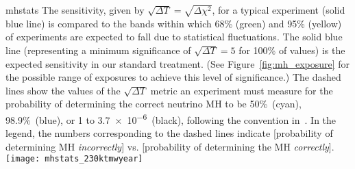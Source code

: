 \begin{cdrfigure}{mhstats}{
  The  sensitivity, given by  $\sqrt{\Delta T}=\sqrt{\Delta\chi^2}$, for a typical experiment 
  (solid blue line) is compared to the bands within which
  68\% (green) and 95\% (yellow) of experiments are expected to fall due to statistical fluctuations.
  The solid blue line (representing a minimum significance of $\sqrt{\Delta T} = 5$ for 100\% of \deltacp
   values) is the expected sensitivity in our standard treatment.
   (See Figure~\ref{fig:mh_exposure} for the possible range of exposures to achieve this level of significance.) 
  The dashed lines show the values of the $\sqrt{\Delta T}$ metric an experiment must measure for the probability of determining
  the correct neutrino MH to be 50\%~(cyan), 98.9\%~(blue), or %
  1 to \num{3.7e-6}~(black), following the convention in~\cite{Qian:2012zn}.  
  In the legend, the numbers corresponding to the dashed lines indicate 
  [probability of determining MH {\em incorrectly}] vs. [probability of determining the MH {\em correctly}].}
 \texttt{[image: mhstats\_230ktmwyear]}
\end{cdrfigure}


